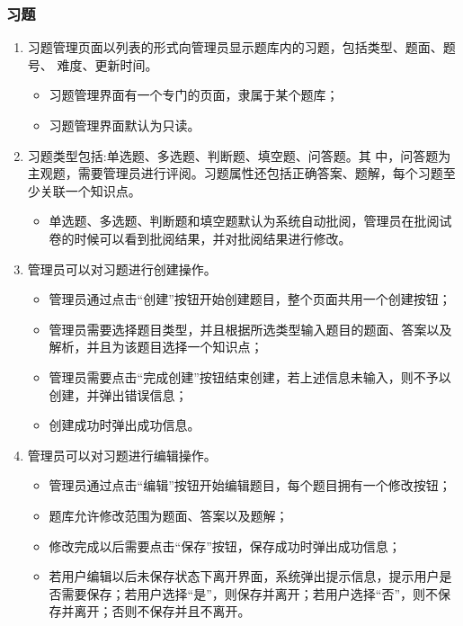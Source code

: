 \documentclass{article}
\begin{document}
    \subsubsection{习题}
    \begin{enumerate}
        \item 习题管理页面以列表的形式向管理员显示题库内的习题，包括类型、题面、题号、
        难度、更新时间。
        \begin{itemize}
            \item 习题管理界面有一个专门的页面，隶属于某个题库；
            \item 习题管理界面默认为只读。
        \end{itemize}

        \item 习题类型包括:单选题、多选题、判断题、填空题、问答题。其
        中，问答题为主观题，需要管理员进行评阅。习题属性还包括正确答案、题解，每个习题至少关联一个知识点。
        \begin{itemize}
            \item 单选题、多选题、判断题和填空题默认为系统自动批阅，管理员在批阅试卷的时候可以看到批阅结果，并对批阅结果进行修改。
        \end{itemize}

        \item 管理员可以对习题进行创建操作。
        \begin{itemize}
            \item 管理员通过点击“创建”按钮开始创建题目，整个页面共用一个创建按钮；
            \item 管理员需要选择题目类型，并且根据所选类型输入题目的题面、答案以及解析，并且为该题目选择一个知识点；
            \item 管理员需要点击“完成创建”按钮结束创建，若上述信息未输入，则不予以创建，并弹出错误信息；
            \item 创建成功时弹出成功信息。
        \end{itemize}

        \item 管理员可以对习题进行编辑操作。
        \begin{itemize}
            \item 管理员通过点击“编辑”按钮开始编辑题目，每个题目拥有一个修改按钮；
            \item 题库允许修改范围为题面、答案以及题解；
            \item 修改完成以后需要点击“保存”按钮，保存成功时弹出成功信息；
            \item 若用户编辑以后未保存状态下离开界面，系统弹出提示信息，提示用户是否需要保存；若用户选择“是”，则保存并离开；若用户选择“否”，则不保存并离开；否则不保存并且不离开。
        \end{itemize}


\end{enumerate}
\end{document}
